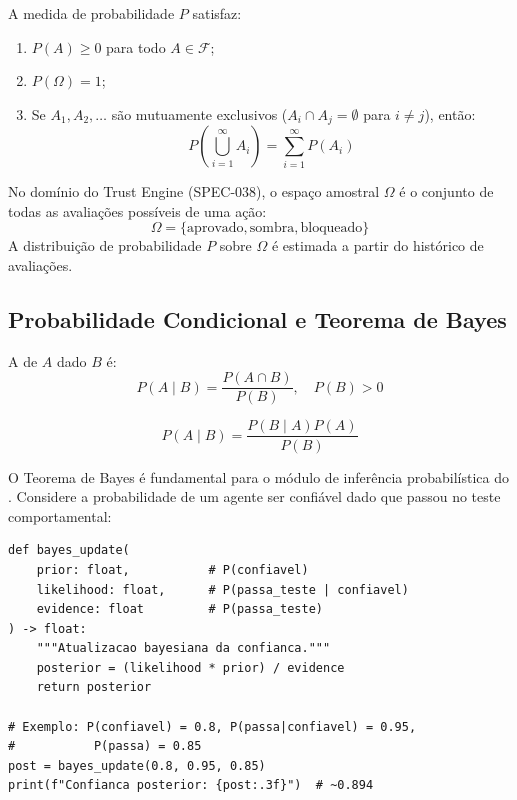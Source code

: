 \begin{definicao}
    A medida de probabilidade $P$ satisfaz:
    \begin{enumerate}
        \item $P(A) \geq 0$ para todo $A \in \mathcal{F}$;
        \item $P(\Omega) = 1$;
        \item Se $A_1, A_2, \ldots$ são mutuamente exclusivos
              ($A_i \cap A_j = \emptyset$ para $i \neq j$), então:
              \[
              P\left(\bigcup_{i=1}^{\infty} A_i\right) =
              \sum_{i=1}^{\infty} P(A_i)
              \]
    \end{enumerate}
\end{definicao}

\begin{exemplo}
    No domínio do Trust Engine (SPEC-038), o espaço amostral $\Omega$ é o
    conjunto de todas as avaliações possíveis de uma ação:
    \[
    \Omega = \{\text{aprovado}, \text{sombra}, \text{bloqueado}\}
    \]
    A distribuição de probabilidade $P$ sobre $\Omega$ é estimada a partir
    do histórico de avaliações.
\end{exemplo}

\subsection{Probabilidade Condicional e Teorema de Bayes}

\begin{definicao}
    A  de $A$ dado $B$ é:
    \[
    P(A \mid B) = \frac{P(A \cap B)}{P(B)}, \quad P(B) > 0
    \]
\end{definicao}

\begin{teorema}
    \[
    P(A \mid B) = \frac{P(B \mid A) P(A)}{P(B)}
    \]
\end{teorema}

\begin{exemplo}
    O Teorema de Bayes é fundamental para o módulo de inferência
    probabilística do \opencodeeco{}. Considere a probabilidade de um agente
    ser confiável dado que passou no teste comportamental:
    \begin{lstlisting}[style=pythonstyle]
def bayes_update(
    prior: float,           # P(confiavel)
    likelihood: float,      # P(passa_teste | confiavel)
    evidence: float         # P(passa_teste)
) -> float:
    """Atualizacao bayesiana da confianca."""
    posterior = (likelihood * prior) / evidence
    return posterior

# Exemplo: P(confiavel) = 0.8, P(passa|confiavel) = 0.95,
#           P(passa) = 0.85
post = bayes_update(0.8, 0.95, 0.85)
print(f"Confianca posterior: {post:.3f}")  # ~0.894
    \end{lstlisting}
\end{exemplo}

